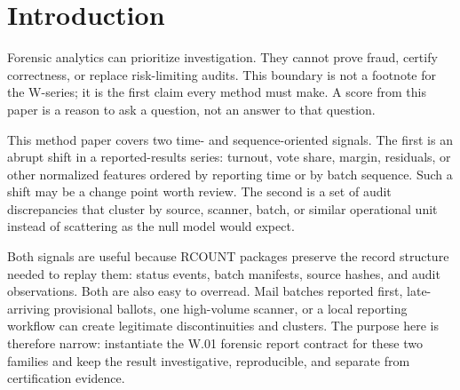 \section{Introduction}

Forensic analytics can prioritize investigation. They cannot prove fraud,
certify correctness, or replace risk-limiting audits. This boundary is not a
footnote for the W-series; it is the first claim every method must make. A
score from this paper is a reason to ask a question, not an answer to that
question.

This method paper covers two time- and sequence-oriented signals. The first is
an abrupt shift in a reported-results series: turnout, vote share, margin,
residuals, or other normalized features ordered by reporting time or by batch
sequence. Such a shift may be a change point worth review. The second is a set
of audit discrepancies that cluster by source, scanner, batch, or similar
operational unit instead of scattering as the null model would expect.

Both signals are useful because RCOUNT packages preserve the record structure
needed to replay them: status events, batch manifests, source hashes, and audit
observations. Both are also easy to overread. Mail batches reported first,
late-arriving provisional ballots, one high-volume scanner, or a local reporting
workflow can create legitimate discontinuities and clusters. The purpose here is
therefore narrow: instantiate the W.01 forensic report contract for these two
families and keep the result investigative, reproducible, and separate from
certification evidence.
